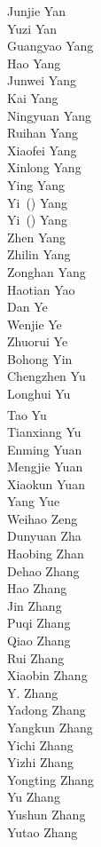 Junjie Yan\\
Yuzi Yan\\
Guangyao Yang\\
Hao Yang\\
Junwei Yang\\
Kai Yang\\
Ningyuan Yang\\
Ruihan Yang\\
Xiaofei Yang\\
Xinlong Yang\\
Ying Yang\\
Yi~() Yang\\
Yi~() Yang\\
Zhen Yang\\
Zhilin Yang\\
Zonghan Yang\\
Haotian Yao\\
Dan Ye\\
Wenjie Ye\\
Zhuorui Ye\\
Bohong Yin\\
Chengzhen Yu\\
Longhui Yu\\
Tao Yu\textsuperscript{\textdagger}\\
Tianxiang Yu\\
Enming Yuan\\
Mengjie Yuan\\
Xiaokun Yuan\\
Yang Yue\\
Weihao Zeng\\
Dunyuan Zha\\
Haobing Zhan\\
Dehao Zhang\\
Hao Zhang\\
Jin Zhang\\
Puqi Zhang\\
Qiao Zhang\\
Rui Zhang\\
Xiaobin Zhang\\
Y. Zhang\\
Yadong Zhang\\
Yangkun Zhang\\
Yichi Zhang\\
Yizhi Zhang\\
Yongting Zhang\\
Yu Zhang\\
Yushun Zhang\\
Yutao Zhang\\
